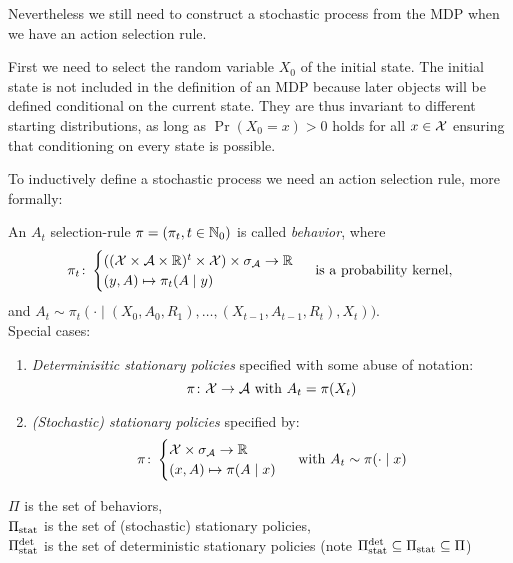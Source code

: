 Nevertheless we still need to construct a stochastic process from the MDP when we have an action selection rule. 

First we need to select the random variable \(X_0\) of the initial state. The initial state is not included in the definition of an MDP because later objects will be defined conditional on the current state. They are thus invariant to different starting distributions, as long as \(\Pr(X_0=x)>0\) holds for all \(x\in\mathcal{X}\) ensuring that conditioning on every state is possible.

To inductively define a stochastic process we need an action selection rule, more formally:

\begin{definition} An \(A_t\) selection-rule \(\pi=(\pi_t,t\in\mathbb{N}_0)\) is called \emph{behavior}, where
	\[ 
		\pi_t\colon
		\begin{cases}
			((\mathcal{X}\times\mathcal{A}\times\mathbb{R})^t\times\mathcal{X})\times\sigma_{\mathcal{A}} \to \mathbb{R} \\
			(y,A)\mapsto \pi_t(A\mid y)
		\end{cases} \text{ is a probability kernel,}
	\]
	and \(A_t\sim \pi_t(\cdot\mid (X_0,A_0,R_1), \dots,(X_{t-1},A_{t-1},R_t),X_t))\).\\
	Special cases:
	\begin{enumerate}
		\item \emph{Determinisitic stationary policies} specified with some abuse of notation:
		\[\leavevmode \pi\colon\cX\to\cA \text{ with }A_t=\pi(X_t)\]
		\item \emph{(Stochastic) stationary policies} specified by:
		\[\pi\colon \begin{cases}
		\mathcal{X}\times\sigma_{\mathcal{A}}\to\mathbb{R}\\
		(x,A)\mapsto \pi(A\mid x)
		\end{cases} \text{ with } A_t\sim\pi(\cdot\mid x)
		\]
	\end{enumerate}
	\(\Pi\) is the set of behaviors,\\
	\(\Pi_{\textnormal{stat}}\) is the set of (stochastic) stationary policies, \\
	\(\Pi_{\textnormal{stat}}^{\textnormal{det}}\) is the set of deterministic stationary policies (note \(\Pi_{\textnormal{stat}}^{\textnormal{det}}\subseteq\Pi_{\textnormal{stat}}\subseteq \Pi \))
\end{definition}

